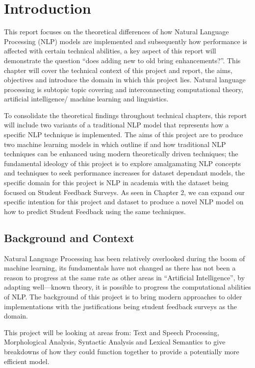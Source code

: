 \chapter{Introduction} \label{chapter:Introduction}

This report focuses on the theoretical differences of how Natural Language Processing (NLP) models are implemented and subsequently how performance is affected with certain technical abilities, a key aspect of this report will demonstrate the question “does adding new to old bring enhancements?”. This chapter will cover the technical context of this project and report, the aims, objectives and introduce the domain in which this project lies. Natural language processing is subtopic topic covering and interconnecting computational theory, artificial intelligence/ machine learning and linguistics.

To consolidate the theoretical findings throughout technical chapters, this report will include two variants of a traditional NLP model that represents how a specific NLP technique is implemented. The aims of this project are to produce two machine learning models in which outline if and how traditional NLP techniques can be enhanced using modern theoretically driven techniques; the fundamental ideology of this project is to explore amalgamating NLP concepts and techniques to seek performance increases for dataset dependant models, the specific domain for this project is NLP in academia with the dataset being focused on Student Feedback Surveys. As seen in Chapter 2, we can expand our specific intention for this project and dataset to produce a novel NLP model on how to predict Student Feedback using the same techniques.

\section{Background and Context}

Natural Language Processing has been relatively overlooked during the boom of machine learning, its fundamentals have not changed as there has not been a reason to progress at the same rate as other areas in “Artificial Intelligence”, by adapting well---known theory, it is possible to progress the computational abilities of NLP. The background of this project is to bring modern approaches to older implementations with the justifications being student feedback surveys as the domain.

This project will be looking at areas from: Text and Speech Processing, Morphological Analysis, Syntactic Analysis and Lexical Semantics to give breakdowns of how they could function together to provide a potentially more efficient model.

